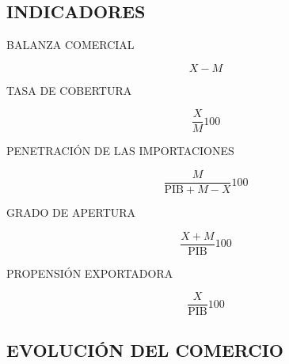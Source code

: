 \documentclass[11pt]{article}
\begin{document}
    \subsection{INDICADORES}\label{indicadores}

BALANZA COMERCIAL

\begin{equation}
X - M
\end{equation}

TASA DE COBERTURA

\begin{equation}
\frac{X}{M}100
\end{equation}

PENETRACIÓN DE LAS IMPORTACIONES

\begin{equation}
\frac{M}{\text{PIB} + M - X} 100
\end{equation}

GRADO DE APERTURA

\begin{equation}
\frac{X+M}{\text{PIB}} 100
\end{equation}

PROPENSIÓN EXPORTADORA

\begin{equation}
\frac{X}{\text{PIB}} 100
\end{equation}

    \subsection{EVOLUCIÓN DEL COMERCIO}\label{evoluciuxf3n-del-comercio}
\end{document}
